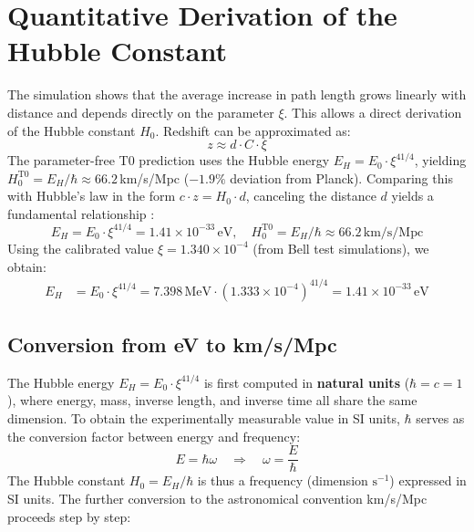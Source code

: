	\section{Quantitative Derivation of the Hubble Constant}
	The simulation shows that the average increase in path length grows linearly with distance and depends directly on the parameter $\xi$. This allows a direct derivation of the Hubble constant $H_0$.
	Redshift can be approximated as:
	\begin{equation}
		z \approx d \cdot C \cdot \xi
	\end{equation}
	The parameter-free T0 prediction uses the Hubble energy $E_H = E_0 \cdot \xi^{41/4}$, yielding $H_0^{\text{T0}} = E_H/\hbar \approx 66.2\,$km/s/Mpc ($-1.9\%$ deviation from Planck).
	Comparing this with Hubble's law in the form $c \cdot z = H_0 \cdot d$, canceling the distance $d$ yields a fundamental relationship \cite{pascher:geometric_formalism}:
	\begin{equation}
		E_H = E_0 \cdot \xi^{41/4} = 1.41 \times 10^{-33}\,\text{eV}, \quad H_0^{\text{T0}} = E_H/\hbar \approx 66.2\,\text{km/s/Mpc}
	\end{equation}
	Using the calibrated value $\xi = 1.340 \times 10^{-4}$ (from Bell test simulations), we obtain:
	\begin{align*}
		E_H &= E_0 \cdot \xi^{41/4} = 7.398\,\text{MeV} \cdot (1.333 \times 10^{-4})^{41/4} = 1.41 \times 10^{-33}\,\text{eV}
	\end{align*}
	
	\subsection{Conversion from eV to km/s/Mpc}
	
	The Hubble energy $E_H = E_0 \cdot \xi^{41/4}$ is first computed in \textbf{natural units} ($\hbar = c = 1$), where energy, mass, inverse length, and inverse time all share the same dimension. To obtain the experimentally measurable value in SI units, $\hbar$ serves as the conversion factor between energy and frequency:
	\begin{equation}
		E = \hbar \omega \quad \Longrightarrow \quad \omega = \frac{E}{\hbar}
	\end{equation}
	The Hubble constant $H_0 = E_H/\hbar$ is thus a frequency (dimension $\text{s}^{-1}$) expressed in SI units. The further conversion to the astronomical convention km/s/Mpc proceeds step by step:
	
